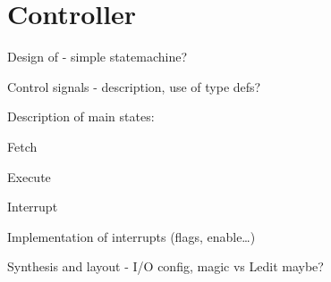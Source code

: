 
\section{Controller}

Design of - simple statemachine?

Control signals - description, use of type defs?

Description of main states:

Fetch

Execute

Interrupt

Implementation of interrupts (flags, enable\dots)

Synthesis and layout - I/O config, magic vs Ledit maybe?
